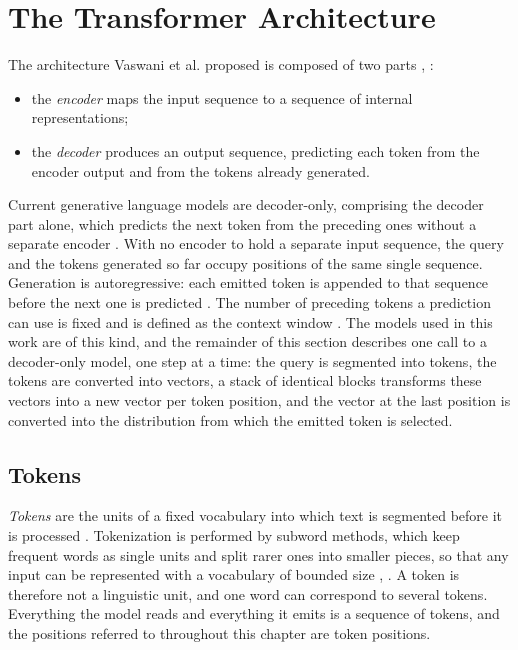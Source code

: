 \section{The Transformer Architecture}
\label{sec:transformer}

The architecture Vaswani et al. proposed is composed of two parts \cite{vaswaniAttentionAllYou2023}, \cite[Chap.~25]{russellArtificialIntelligenceModern2022}:
\begin{itemize}
    \item the \emph{encoder} maps the input sequence to a sequence of internal representations;
    \item the \emph{decoder} produces an output sequence, predicting each token from the encoder output and from the tokens already generated.
\end{itemize}

Current generative language models are decoder-only, comprising the decoder part alone, which predicts the next token from the preceding ones without a separate encoder \cite[Chap.~25]{russellArtificialIntelligenceModern2022}. With no encoder to hold a separate input sequence, the query and the tokens generated so far occupy positions of the same single sequence. Generation is autoregressive: each emitted token is appended to that sequence before the next one is predicted \cite{zhaoSurveyLargeLanguage2026}. The number of preceding tokens a prediction can use is fixed and is defined as the context window \cite{zhaoSurveyLargeLanguage2026}. The models used in this work are of this kind, and the remainder of this section describes one call to a decoder-only model, one step at a time: the query is segmented into tokens, the tokens are converted into vectors, a stack of identical blocks transforms these vectors into a new vector per token position, and the vector at the last position is converted into the distribution from which the emitted token is selected.

\subsection{Tokens}
\label{subsec:tokens}

\emph{Tokens} are the units of a fixed vocabulary into which text is segmented before it is processed \cite{zhaoSurveyLargeLanguage2026}. Tokenization is performed by subword methods, which keep frequent words as single units and split rarer ones into smaller pieces, so that any input can be represented with a vocabulary of bounded size \cite{zhaoSurveyLargeLanguage2026}, \cite[Chap.~24]{russellArtificialIntelligenceModern2022}. A token is therefore not a linguistic unit, and one word can correspond to several tokens. Everything the model reads and everything it emits is a sequence of tokens, and the positions referred to throughout this chapter are token positions.

